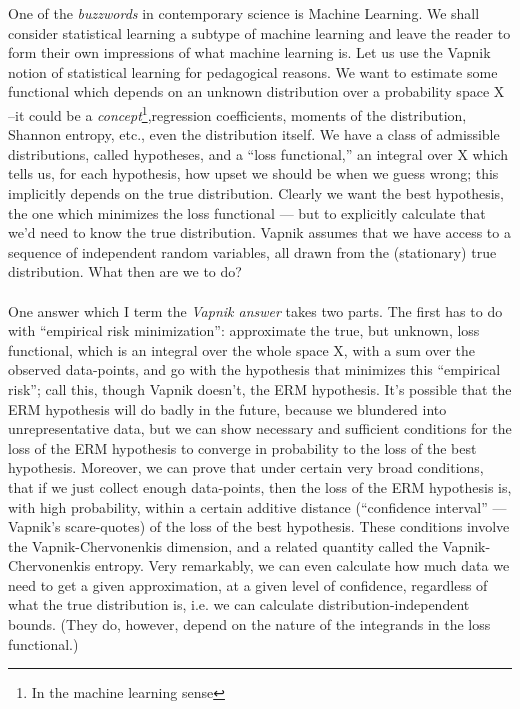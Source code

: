 \documentclass[12pt, oneside, a4paper]{article}
\theoremstyle{plain}
\theoremstyle{definition}
\begin{document}
One of the \textit{buzzwords} in contemporary science is Machine Learning. We shall consider statistical learning a subtype of 
machine learning and leave the reader to form their own impressions of what machine learning is. 
Let us use the Vapnik notion of statistical learning for pedagogical reasons. We want to estimate some functional which depends on
an unknown distribution over a probability space X --it could be a \textit{concept}\footnote{In the machine learning sense},regression
coefficients, moments of the distribution, Shannon entropy, etc., even the distribution itself. We have a class of admissible distributions, called hypotheses, and a ``loss functional,'' an integral over X which tells us, for each hypothesis, how upset we should be when we guess wrong; this implicitly depends on the true distribution. Clearly we want the best hypothesis, the one which minimizes the loss functional --- but to explicitly calculate that we'd need to know the true distribution. 
Vapnik assumes that we have access to a sequence of independent random variables, all drawn from the 
(stationary) true distribution. What then are we to do?
\paragraph{}
One answer which I term the \textit{Vapnik answer} takes two parts.
 The first has to do with ``empirical risk minimization'': approximate the true, but unknown, loss 
functional, which is an integral over the whole space X, with a sum over the observed data-points, and go with the hypothesis that 
minimizes this ``empirical risk''; call this, though Vapnik doesn't, the ERM hypothesis. It's possible that the ERM hypothesis will do 
badly in the future, because we blundered into unrepresentative data, but we can show necessary and sufficient conditions for the loss 
of the ERM hypothesis to converge in probability to the loss of the best hypothesis. Moreover, we can prove that under certain very 
broad conditions, that if we just collect enough data-points, then the loss of the ERM hypothesis is, with high probability, within a 
certain additive distance (``confidence interval'' --- Vapnik's scare-quotes) of the loss of the best hypothesis. 
These conditions involve the Vapnik-Chervonenkis dimension, and a related quantity called the Vapnik-Chervonenkis entropy. 
Very remarkably, we can even calculate how much data we need to get a given approximation, at a given level of confidence, regardless 
of what the true distribution is, i.e. we can calculate distribution-independent bounds. (They do, however, depend on the nature of 
the integrands in the loss functional.)
\end{document}
